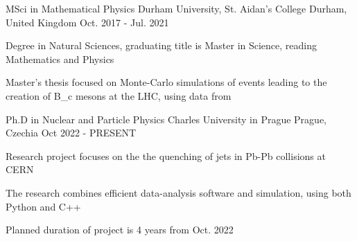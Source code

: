 

\begin{cventries}

  \cventry
    {MSci in Mathematical Physics} %
	{Durham University, St. Aidan's College} %
    {Durham, United Kingdom} %
    {Oct. 2017 - Jul. 2021} %
    {
      \begin{cvitems} %
        \item {Degree in Natural Sciences, graduating title is Master in Science, reading Mathematics and Physics}
		\item {Master's thesis focused on Monte-Carlo simulations of events leading to the creation of B_{c} mesons at the LHC, using data from }
      \end{cvitems}
    }
  \cventry
	{Ph.D in Nuclear and Particle Physics}
	{Charles University in Prague}
	{Prague, Czechia}
	{Oct 2022 - PRESENT}
	{
		\begin{cvitems}
			\item {Research project focuses on the the quenching of jets in Pb-Pb collisions at CERN}
			\item {The research combines efficient data-analysis software and simulation, using both Python and C++}
			\item {Planned duration of project is 4 years from Oct. 2022}
		
		\end{cvitems}
	}

\end{cventries}
